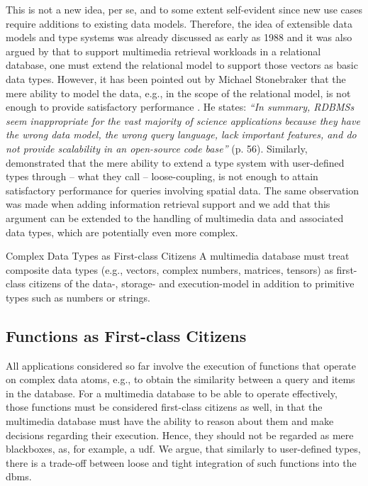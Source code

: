This is not a new idea, per se, and to some extent self-evident since new use cases require additions to existing data models. Therefore, the idea of extensible data models and type systems was already discussed as early as 1988 \cite{Linnemann:1988Design} and it was also argued by \cite{Giangreco:2018Database} that to support multimedia retrieval workloads in a relational database, one must extend the relational model to support those vectors as basic data types. However, it has been pointed out by Michael Stonebraker that the mere ability to model the data, e.g., in the scope of the relational model, is not enough to provide satisfactory performance \cite{Stonebraker:2013SciDB}. He states: \emph{``In summary, RDBMSs seem inappropriate for the vast majority of science applications because they have the wrong data model, the wrong query language, lack important features, and do not provide scalability in an open-source code base''} \cite{Stonebraker:2013SciDB} (p. 56). Similarly, \cite{Whang:2010Tightly} demonstrated that the mere ability to extend a type system with user-defined types through -- what they call -- loose-coupling, is not enough to attain satisfactory performance for queries involving spatial data. The same observation was made when adding information retrieval support \cite{Whang:2015DB} and we add that this argument can be extended to the handling of multimedia data and associated data types, which are potentially even more complex.

\begin{requirement}[label=requirement:complex_data_types]{Complex Data Types as First-class Citizens}{}
    A multimedia database must treat composite data types (e.g., vectors, complex numbers, matrices, tensors) as first-class citizens of the data-, storage- and execution-model in addition to primitive types such as numbers or strings.
\end{requirement}

\subsection{Functions as First-class Citizens}

All applications considered so far involve the execution of functions that operate on complex data atoms, e.g., to obtain the similarity between a query and items in the database. For a multimedia database to be able to operate effectively, those functions must be considered first-class citizens as well, in that the multimedia database must have the ability to reason about them and make decisions regarding their execution. Hence, they should not be regarded as mere blackboxes, as, for example, a \acrshort{udf}. We argue, that similarly to user-defined types, there is a trade-off between loose and tight integration of such functions into the \acrshort{dbms}.

